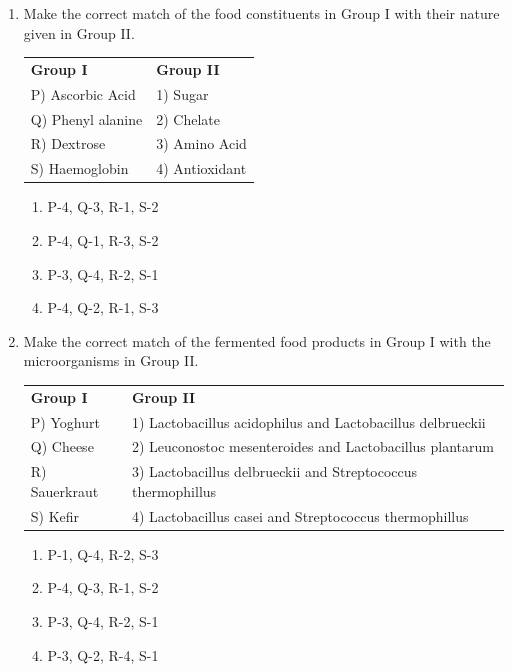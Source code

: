 \documentclass[journal,12pt,onecolumn]{IEEEtran}
\begin{document}
\begin{enumerate}[label=\arabic*.]
The nature of inhibition shown in the plot is
\begin{multicols}{2}
\begin{enumerate}[label=(\Alph*)]
\item Non-competitive
\item Anti-competitive
\item Competitive
\item Mixed type
\end{enumerate}
\end{multicols}

\item Make the correct match of the food constituents in Group I with their nature given in Group II.
\begin{center}
\begin{tabular}{p{6cm} p{6cm}}
\textbf{Group I} & \textbf{Group II} \\
P) Ascorbic Acid & 1) Sugar \\
Q) Phenyl alanine & 2) Chelate \\
R) Dextrose & 3) Amino Acid \\
S) Haemoglobin & 4) Antioxidant \\
\end{tabular}
\end{center}
\begin{multicols}{2}
\begin{enumerate}[label=(\Alph*)]
\item P-4, Q-3, R-1, S-2
\item P-4, Q-1, R-3, S-2
\item P-3, Q-4, R-2, S-1
\item P-4, Q-2, R-1, S-3
\end{enumerate}
\end{multicols}

\item Make the correct match of the fermented food products in Group I with the microorganisms in Group II.
\begin{center}
\begin{tabular}{p{6cm} p{6cm}}
\textbf{Group I} & \textbf{Group II} \\
P) Yoghurt & 1) Lactobacillus acidophilus and Lactobacillus delbrueckii \\
Q) Cheese & 2) Leuconostoc mesenteroides and Lactobacillus plantarum \\
R) Sauerkraut & 3) Lactobacillus delbrueckii and Streptococcus thermophillus \\
S) Kefir & 4) Lactobacillus casei and Streptococcus thermophillus \\
\end{tabular}
\end{center}
\begin{multicols}{2}
\begin{enumerate}[label=(\Alph*)]
\item P-1, Q-4, R-2, S-3
\item P-4, Q-3, R-1, S-2
\item P-3, Q-4, R-2, S-1
\item P-3, Q-2, R-4, S-1
\end{enumerate}
\end{multicols}


\end{enumerate}
\end{document}
